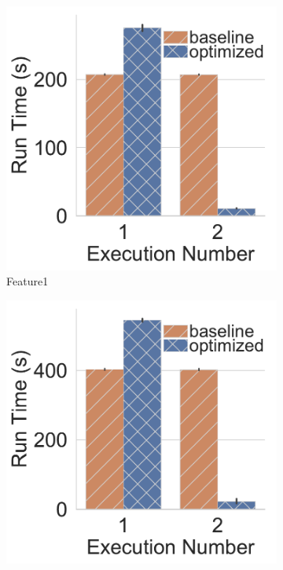 \begin{figure}
\begin{subfigure}[b]{0.33\linewidth}
\centering
\includegraphics[width=\linewidth]{../images/experiment-results/reuse/kaggle-repeated-workloads/introduction_to_manual_feature_engineering}
\caption{Feature1}
\end{subfigure}%
\begin{subfigure}[b]{0.33\linewidth}
\centering
\includegraphics[width=\linewidth]{../images/experiment-results/reuse/kaggle-repeated-workloads/introduction_to_manual_feature_engineering_p2}

\end{subfigure}
\end{figure}

